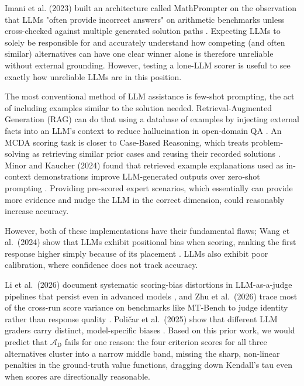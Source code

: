 \documentclass[final,3p,times]{elsarticle}
\begin{document}
Imani et al. (2023) built an architecture called MathPrompter on the observation that LLMs "often provide incorrect answers" on arithmetic benchmarks unless cross-checked against multiple generated solution paths \cite{imani2023mathprompter}. Expecting LLMs to solely be responsible for and accurately understand how competing (and often similar) alternatives can have one clear winner alone is therefore unreliable without external grounding. However, testing a lone-LLM scorer is useful to see exactly how unreliable LLMs are in this position.

The most conventional method of LLM assistance is few-shot prompting, the act of including examples similar to the solution needed. Retrieval-Augmented Generation (RAG) can do that using a database of examples by injecting external facts into an LLM's context to reduce hallucination in open-domain QA \cite{lewis2020}. An MCDA scoring task is closer to Case-Based Reasoning, which treats problem-solving as retrieving similar prior cases and reusing their recorded solutions \cite{aamodtplaza1994}. Minor and Kaucher (2024) found that retrieved example explanations used as in-context demonstrations improve LLM-generated outputs over zero-shot prompting \cite{minorkaucher2024}. Providing pre-scored expert scenarios, which essentially can provide more evidence and nudge the LLM in the correct dimension, could reasonably increase accuracy.

However, both of these implementations have their fundamental flaws; Wang et al.\ (2024) show that LLMs exhibit positional bias when scoring, ranking the first response higher simply because of its placement \cite{wang2024fairescalers}. LLMs also exhibit poor calibration, where confidence does not track accuracy.

Li et al.\ (2026) document systematic scoring-bias distortions in LLM-as-a-judge pipelines that persist even in advanced models \cite{li2026scoringbias}, and Zhu et al.\ (2026) trace most of the cross-run score variance on benchmarks like MT-Bench to judge identity rather than response quality \cite{zhu2026cyclicjudge}. Poličar et al.\ (2025) show that different LLM graders carry distinct, model-specific biases \cite{policar2025bioinformatics}. Based on this prior work, we would predict that $\mathcal{A}_{\text{D}}$ fails for one reason: the four criterion scores for all three alternatives cluster into a narrow middle band, missing the sharp, non-linear penalties in the ground-truth value functions, dragging down Kendall's tau even when scores are directionally reasonable.
\end{document}
